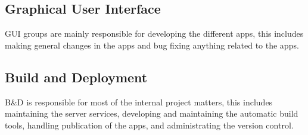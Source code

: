 \subsection{Graphical User Interface}
GUI groups are mainly responsible for developing the different apps, this includes making general changes in the apps and bug fixing anything related to the apps.

\subsection{Build and Deployment}
B\&D is responsible for most of the internal project matters, this includes maintaining the server services, developing and maintaining the automatic build tools, handling publication of the apps, and administrating the version control.